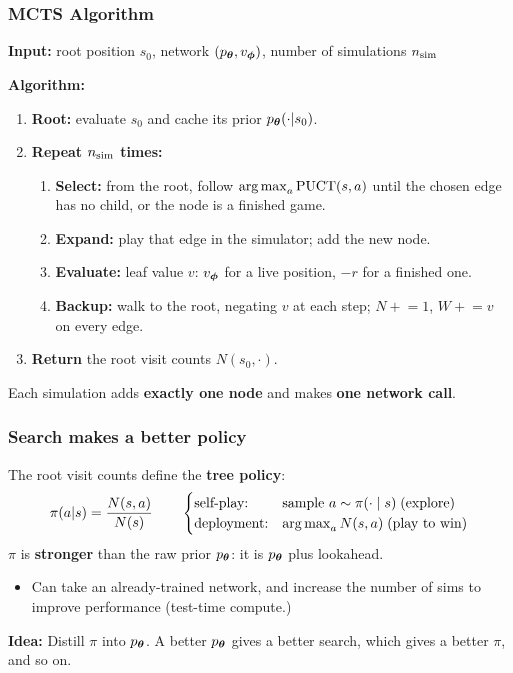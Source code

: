 \begin{frame}
    \frametitle{MCTS Algorithm}
    \textbf{Input:} root position $s_0$, network $(p_{\boldsymbol{\theta}}, v_{\boldsymbol{\phi}})$, number of simulations $n_{\text{sim}}$

    \textbf{Algorithm:}
    \begin{enumerate}
        \item \textbf{Root:} evaluate $s_0$ and cache its prior $p_{\boldsymbol{\theta}}(\cdot|s_0)$.
        \item \textbf{Repeat $n_{\text{sim}}$ times:}
        \begin{enumerate}
            \item \textbf{Select:} from the root, follow $\operatorname*{arg\,max}_a \text{PUCT}(s,a)$ until the
            chosen edge has no child, or the node is a finished game.
            \item \textbf{Expand:} play that edge in the simulator; add the new node.
            \item \textbf{Evaluate:} leaf value $v$: $v_{\boldsymbol{\phi}}$ for a live position, $-r$ for a finished one.
            \item \textbf{Backup:} walk to the root, negating $v$ at each step;
            $N \mathrel{+}= 1$, $W \mathrel{+}= v$ on every edge.
        \end{enumerate}
        \item \textbf{Return} the root visit counts $N(s_0, \cdot)$.
    \end{enumerate}
    \vspace{0.2cm}
    Each simulation adds \textbf{exactly one node} and makes \textbf{one network call}.
\end{frame}


\begin{frame}
    \frametitle{Search makes a better policy}
    The root visit counts define the \textbf{tree policy}:
    $$
    \pi(a|s) = \frac{N(s,a)}{N(s)}
    \qquad
    \begin{cases}
        \text{self-play:} & \text{sample } a \sim \pi(\cdot \mid s) \;\text{(explore)} \\
        \text{deployment:} & \operatorname*{arg\,max}_a N(s,a) \;\text{(play to win)}
    \end{cases}
    $$
    \pause
    $\pi$ is \textbf{stronger} than the raw prior $p_{\boldsymbol{\theta}}$: it is $p_{\boldsymbol{\theta}}$ plus lookahead.
    \begin{itemize}
        \pause
        \item Can take an already-trained network, and increase the number of sims to improve performance
        (test-time compute.)
    \end{itemize}
    \pause
    \vspace{0.2cm}
    \textbf{Idea:} Distill $\pi$ into $p_{\boldsymbol{\theta}}$. A better $p_{\boldsymbol{\theta}}$ gives a better search,
    which gives a better $\pi$, and so on.
\end{frame}

